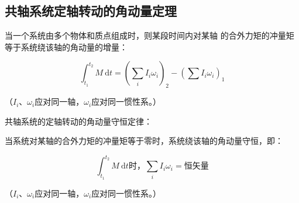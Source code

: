 \documentclass[12pt, a4paper]{article}
\numberwithin{equation}{section}
\newcommand{\rmd}{\mathrm{~d}}
\begin{document}
\subsection{共轴系统定轴转动的角动量定理}

    当一个系统由多个物体和质点组成时，则某段时间内对某轴
    的合外力矩的冲量矩等于系统绕该轴的角动量的增量：

    $$
    \int_{t_1}^{t_2} M \mathrm{~d} t=\left(\sum_i I_i \omega_i\right)_2-\left(\sum I_i \omega_i\right)_1
    $$

    （\(I_i\)、\(\omega_i\)应对同一轴，\(\omega_i\)应对同一惯性系。）

    共轴系统的定轴转动的角动量守恒定律：

    当系统对某轴的合外力矩的冲量矩等于零时，系统绕该轴的角动量守恒，即：

    \begin{equation}
        \int_{t_1}^{t_2} M \rmd t \text{时，} \sum_{i} I_i \omega_i = \text{恒矢量}
    \end{equation}

    （\(I_i\)、\(\omega_i\)应对同一轴，\(\omega_i\)应对同一惯性系。）
\end{document}
